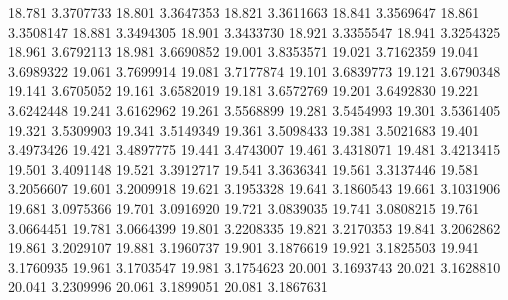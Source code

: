 18.781 3.3707733
18.801 3.3647353
18.821 3.3611663
18.841 3.3569647
18.861 3.3508147
18.881 3.3494305
18.901 3.3433730
18.921 3.3355547
18.941 3.3254325
18.961 3.6792113
18.981 3.6690852
19.001 3.8353571
19.021 3.7162359
19.041 3.6989322
19.061 3.7699914
19.081 3.7177874
19.101 3.6839773
19.121 3.6790348
19.141 3.6705052
19.161 3.6582019
19.181 3.6572769
19.201 3.6492830
19.221 3.6242448
19.241 3.6162962
19.261 3.5568899
19.281 3.5454993
19.301 3.5361405
19.321 3.5309903
19.341 3.5149349
19.361 3.5098433
19.381 3.5021683
19.401 3.4973426
19.421 3.4897775
19.441 3.4743007
19.461 3.4318071
19.481 3.4213415
19.501 3.4091148
19.521 3.3912717
19.541 3.3636341
19.561 3.3137446
19.581 3.2056607
19.601 3.2009918
19.621 3.1953328
19.641 3.1860543
19.661 3.1031906
19.681 3.0975366
19.701 3.0916920
19.721 3.0839035
19.741 3.0808215
19.761 3.0664451
19.781 3.0664399
19.801 3.2208335
19.821 3.2170353
19.841 3.2062862
19.861 3.2029107
19.881 3.1960737
19.901 3.1876619
19.921 3.1825503
19.941 3.1760935
19.961 3.1703547
19.981 3.1754623
20.001 3.1693743
20.021 3.1628810
20.041 3.2309996
20.061 3.1899051
20.081 3.1867631
